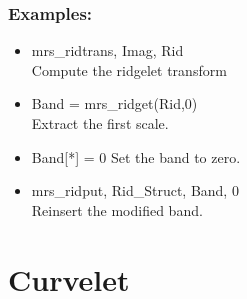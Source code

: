 \subsubsection*{Examples:} 
\begin{itemize}
\item mrs\_ridtrans, Imag, Rid   \\
Compute the ridgelet transform
\item Band = mrs\_ridget(Rid,0) \\
Extract the first scale.
\item Band[*] = 0
Set the band to zero.
\item mrs\_ridput, Rid\_Struct, Band,  0 \\
Reinsert the modified band.  
\end{itemize}

\section{Curvelet}

